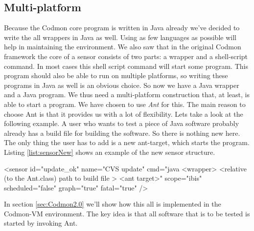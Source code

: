 \documentclass{article}
\newcommand{\project}{Codmon-VM}
\begin{document}
\subsection{Multi-platform}
\label{road:multi}
Because the Codmon core program is written in Java already we've decided to write the all wrappers in Java as well. Using as few languages as possible will help in maintaining the environment. 
We also saw that in the original Codmon framework the core of a sensor consists of two parts: a wrapper and a shell-script command. In most cases this shell script command will start some 
program. This program should also be able to run on multiple platforms, so writing these programs in Java as well is an obvious choice. So now we have a Java wrapper and a Java program. We thus need a 
multi-platform construction that, at least, is able to start a program. We have chosen to use \emph{Ant} for this. The main reason to choose Ant is that it provides us with a lot of flexibility. Lets take 
a look at the following example. A user who wants to test a piece of Java software probably already has a build file for building the software. So there is nothing new here. The only thing the user has 
to add is a new ant-target, which starts the program. Listing \ref{list:sensorNew} shows an example of the new sensor structure.

\begin{code}[frame=shadowbox, language=XML,showstringspaces=false]
 <sensor id="update_ok" 
    name="CVS update" 
    cmd="java <wrapper> <relative (to the Ant.class) path to build file > <ant target>" 
    scope="ibis" 
    scheduled="false" 
    graph="true" 
    fatal="true" />
\end{code}

In section \ref{sec:Codmon2.0} we'll show how this all is implemented in the \project{} environment. The key idea is that all software that is to be tested is started by invoking Ant.\\
\end{document}
